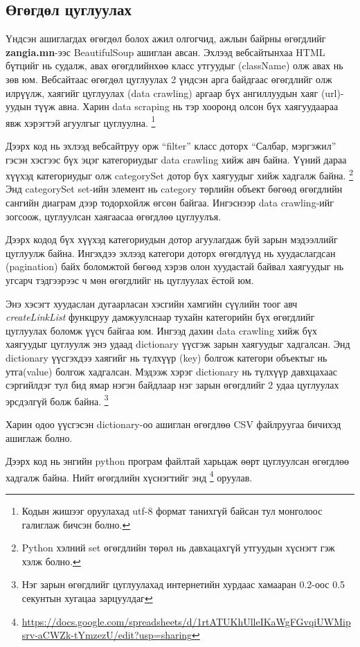 \subsection{Өгөгдөл цуглуулах}
Үндсэн ашиглагдах өгөгдөл болох ажил олгогчид, ажлын байрны өгөгдлийг \textbf{zangia.mn}-ээс BeautifulSoup ашиглан авсан. Эхлээд вебсайтынхаа HTML бүтцийг нь судалж, авах өгөгдлийнхөө класс утгуудыг (className) олж авах нь зөв юм. Вебсайтаас өгөгдөл цуглуулах 2 үндсэн арга байдгаас өгөгдлийг олж илрүүлж, хаягийг цуглуулах (data crawling) аргаар бүх ангиллуудын хаяг (url)-уудын түүж авна. Харин data scraping нь тэр хооронд олсон бүх хаягуудаараа явж хэрэгтэй агуулгыг цуглуулна. \footnote{Кодын жишээг оруулахад utf-8 формат танихгүй байсан тул монголоос галиглаж бичсэн болно.}

Дээрх код нь эхлээд вебсайтруу орж ``filter'' класс доторх ``Салбар, мэргэжил'' гэсэн хэсгээс бүх эцэг категориудыг data crawling хийж авч байна. Үүний дараа хүүхэд категориудыг олж categorySet дотор бүх хаягуудыг хийж хадгалж байна. \footnote{Python хэлний set өгөгдлийн төрөл нь давхацахгүй утгуудын хүснэгт гэж хэлж болно. } Энд categorySet set-ийн элемент нь category төрлийн объект бөгөөд өгөгдлийн сангийн диаграм дээр тодорхойлж өгсөн байгаа. Ингэснээр data crawling-ийг зогсоож, цуглуулсан хаягаасаа өгөгдлөө цуглуулъя.  

Дээрх кодод бүх хүүхэд категориудын дотор агуулагдаж буй зарын мэдээллийг цуглуулж байна. Ингэхдээ эхлээд категори доторх өгөгдлүүд нь хуудаслагдсан (pagination) байх боломжтой бөгөөд хэрэв олон хуудастай байвал хаягуудыг нь угсарч тэдгээрээс ч мөн өгөгдлийг нь цуглуулах ёстой юм. 

Энэ хэсэгт хуудаслан дугаарласан хэсгийн хамгийн сүүлийн тоог авч \textit{createLinkList} функцруу дамжуулснаар тухайн категорийн бүх өгөгдлийг цуглуулах боломж үүсч байгаа юм. Ингээд дахин data crawling хийж бүх хаягуудыг цуглуулж энэ удаад dictionary үүсгэж зарын хаягуудыг хадгалсан. Энд dictionary үүсгэхдээ хаягийг нь түлхүүр (key) болгож категори объектыг нь утга(value) болгож хадгалсан. Мэдээж хэрэг dictionary нь түлхүүр давхцахаас сэргийлдэг тул бид ямар нэгэн байдлаар нэг зарын өгөгдлийг 2 удаа цуглуулах эрсдэлгүй болж байна. \footnote{Нэг зарын өгөгдлийг цуглуулахад интернетийн хурдаас хамааран 0.2-оос 0.5 секунтын хугацаа зарцуулдаг}

Харин одоо үүсгэсэн dictionary-оо ашиглан өгөгдлөө CSV файлруугаа бичихэд ашиглаж болно. 

Дээрх код нь энгийн python програм файлтай харьцаж өөрт цуглуулсан өгөгдлөө хадгалж байна. Нийт өгөгдлийн хүснэгтийг энд \footnote{\url{https://docs.google.com/spreadsheets/d/1rtATUKhUlleIKaWgFGvqiUWMipsrv-aCWZk-tYmzezU/edit?usp=sharing}} оруулав.

